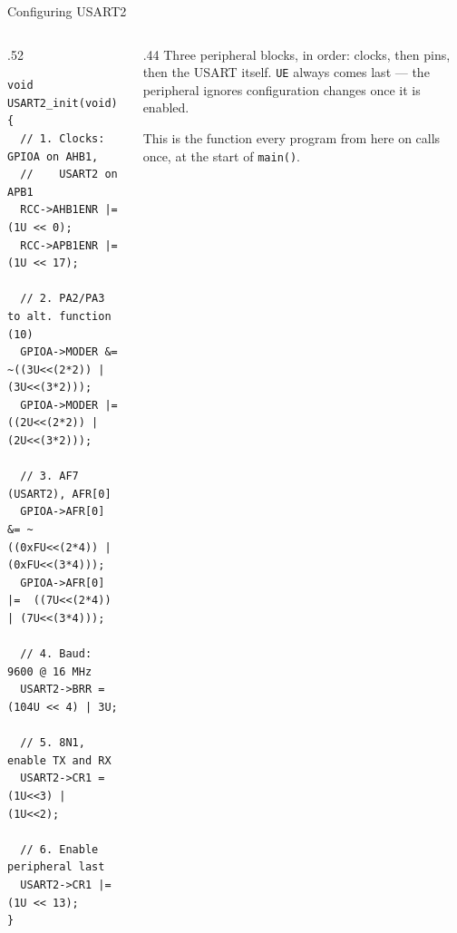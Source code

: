 \documentclass[9pt,aspectratio=169,xcolor=table]{beamer}
\begin{document}
\begin{frame}[fragile]{Configuring USART2}
    \begin{columns}[c]
    \begin{column}{.52\textwidth}
        \begin{lstlisting}[style=myc, basicstyle=\scriptsize\ttfamily]
void USART2_init(void) {
  // 1. Clocks: GPIOA on AHB1,
  //    USART2 on APB1
  RCC->AHB1ENR |= (1U << 0);
  RCC->APB1ENR |= (1U << 17);

  // 2. PA2/PA3 to alt. function (10)
  GPIOA->MODER &=  ~((3U<<(2*2)) | (3U<<(3*2)));
  GPIOA->MODER |=  ((2U<<(2*2)) | (2U<<(3*2)));

  // 3. AF7 (USART2), AFR[0]
  GPIOA->AFR[0] &= ~((0xFU<<(2*4)) | (0xFU<<(3*4)));
  GPIOA->AFR[0] |=  ((7U<<(2*4)) | (7U<<(3*4)));

  // 4. Baud: 9600 @ 16 MHz
  USART2->BRR = (104U << 4) | 3U;

  // 5. 8N1, enable TX and RX
  USART2->CR1 = (1U<<3) | (1U<<2);

  // 6. Enable peripheral last
  USART2->CR1 |= (1U << 13);
}
    \end{lstlisting}
    \end{column}
    \begin{column}{.44\textwidth}
        {\small Three peripheral blocks, in order: \alert{clocks}, then
        \alert{pins}, then the \alert{USART} itself. \texttt{UE} always comes
        last --- the peripheral ignores configuration changes once it is
        enabled.}

        \vspace{2mm}
        {\small This is the function every program from here on calls once,
        at the start of \texttt{main()}.}
    \end{column}
    \end{columns}
\end{frame}
\end{document}
